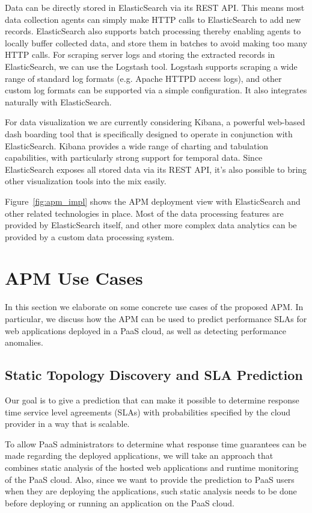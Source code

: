 \documentclass[11pt]{article}
\begin{document}
Data can be directly stored in ElasticSearch via its REST API. This means most data collection agents can 
simply make HTTP calls to ElasticSearch to add new records. ElasticSearch also supports batch 
processing thereby enabling agents to locally buffer collected data, and store them in batches to avoid
making too many HTTP calls. For scraping server logs and storing the extracted records in ElasticSearch,
we can use the Logstash tool. Logstash supports scraping a wide range of standard log formats (e.g. 
Apache HTTPD access logs), and other custom log formats can be supported via a simple configuration.
It also integrates naturally with ElasticSearch.

For data visualization we are currently considering Kibana, a powerful web-based dash boarding tool 
that is specifically designed to operate in conjunction with ElasticSearch. Kibana provides a wide
range of charting and tabulation capabilities, with particularly strong support for temporal data.  Since
ElasticSearch exposes all stored data via its REST API, it's also possible to bring other visualization
tools into the mix easily.

Figure~\ref{fig:apm_impl} shows the APM deployment view with ElasticSearch and other related technologies
in place. Most of the data processing features are provided by ElasticSearch itself, and other more complex
data analytics can be provided by a custom data processing system. 

\section{APM Use Cases}
In this section we elaborate on some concrete use cases of the proposed APM. In particular, we discuss how
the APM can be used to predict performance SLAs for web applications deployed in a PaaS cloud, as well
as detecting performance anomalies.

\subsection{Static Topology Discovery and SLA Prediction}
Our goal is to give a prediction that can make it possible to determine response time service level agreements (SLAs)
with probabilities specified by the cloud provider in a way that is scalable.

To allow PaaS administrators to determine what response time guarantees can be made
regarding the deployed applications,
we will take an approach that combines static analysis of the hosted web applications and runtime monitoring of the PaaS cloud. 
Also, since we want to provide the prediction to PaaS users when they are deploying the applications,
such static analysis needs to be done before deploying or running an application on the PaaS cloud. 
\end{document}
